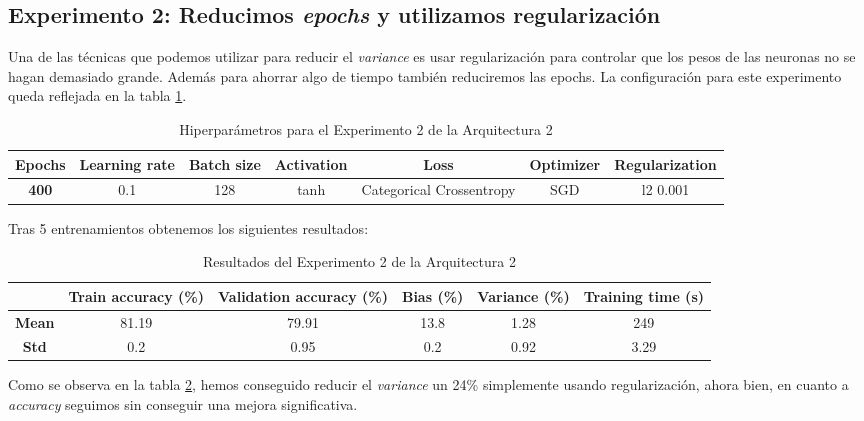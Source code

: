 \documentclass{article}
\begin{document}
			\newpage
			
			
		\subsection{Experimento 2: Reducimos \textit{epochs} y utilizamos regularizaci\'on}
		
			Una de las t\'ecnicas que podemos utilizar para reducir el \textit{variance} es usar regularizaci\'on para controlar que los pesos de las neuronas no se hagan demasiado grande. Adem\'as para ahorrar algo de tiempo tambi\'en reduciremos las epochs. La configuraci\'on para este experimento queda reflejada en la tabla \ref{tab:hip-a2-e2}.
			\begin{table}[!h]
				\begin{center}
					\begin{tabular}{| c | c | c | c | c | c | c |}
						\textbf{Epochs} & \textbf{Learning rate} & \textbf{Batch size} & \textbf{Activation} & \textbf{Loss} & \textbf{Optimizer} & \textbf{Regularization} \\ \hline
						\textbf{400} & 0.1 & 128 & tanh & Categorical Crossentropy & SGD & l2 0.001
					\end{tabular}
					\caption{Hiperpar\'ametros para el Experimento 2 de la Arquitectura 2}
					\label{tab:hip-a2-e2}
				\end{center}
			\end{table}
			
			Tras 5 entrenamientos obtenemos los siguientes resultados:
			
			\begin{table}[!h]
				\begin{center}
					\begin{tabular}{ c | c | c | c | c | c |}
						\ & \textbf{Train accuracy (\%)} & \textbf{Validation accuracy (\%)} & \textbf{Bias (\%)} & \textbf{Variance (\%)} & \textbf{Training time (s)} \\ \hline
						\textbf{Mean} & 81.19 & 79.91 & 13.8 & 1.28 & 249\\ \hline
						\textbf{Std} & 0.2 & 0.95 & 0.2 & 0.92 & 3.29 \\ \hline
					\end{tabular}
					\caption{Resultados del Experimento 2 de la Arquitectura 2}
					\label{tab:res-a2-e2}
				\end{center}
			\end{table}
			
			Como se observa en la tabla \ref{tab:res-a2-e2}, hemos conseguido reducir el \textit{variance} un 24\% simplemente usando regularizaci\'on, ahora bien, en cuanto a \textit{accuracy} seguimos sin conseguir una mejora significativa.
			
\end{document}
